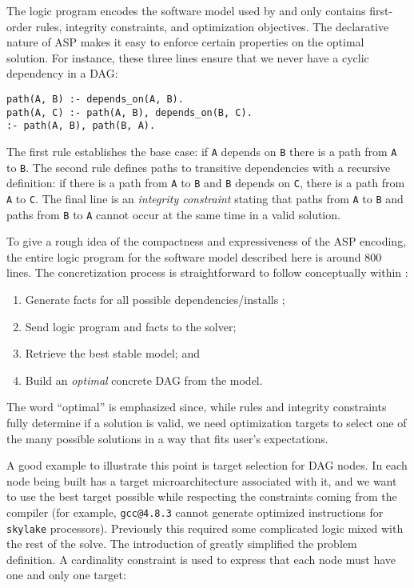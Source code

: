 The logic program encodes the software model used by \spack{} and only contains
first-order rules, integrity constraints, and optimization objectives. The declarative
nature of ASP makes it easy to enforce certain properties on the optimal solution. For
instance, these three lines ensure that we never have a cyclic dependency in a DAG:

\begin{verbatim}
path(A, B) :- depends_on(A, B).
path(A, C) :- path(A, B), depends_on(B, C).
:- path(A, B), path(B, A).
\end{verbatim}

The first rule establishes the base case: if \texttt{A} depends
on \texttt{B} there is a path from \texttt{A} to \texttt{B}.
The second rule defines paths to transitive dependencies
with a recursive definition: if there is a path from \texttt{A}
to \texttt{B} and \texttt{B} depends on \texttt{C}, there is
a path from \texttt{A} to \texttt{C}. The final line is an
\emph{integrity constraint} stating that paths from \texttt{A}
to \texttt{B} and paths from \texttt{B} to \texttt{A} cannot
occur at the same time in a valid solution.

To give a rough idea of the compactness and expressiveness of the ASP encoding, the
entire logic program for the software model described here is around $800$ lines. The
concretization process is straightforward to follow conceptually within \spack:
\begin{enumerate}
\item Generate facts for all possible dependencies/installs \footnotemark;
\item Send logic program and facts to the solver;
\item Retrieve the best stable model; and
\item Build an {\it optimal} concrete DAG from the model.
\end{enumerate}
The word ``optimal'' is emphasized since, while rules and integrity
constraints fully determine if a solution is valid, we need
optimization targets to select one of the many possible solutions
in a way that fits user's expectations.

A good example to illustrate this point is target selection for DAG nodes. In \spack{}
each node being built has a target microarchitecture associated with it, and we want to
use the best target possible while respecting the constraints coming from the compiler
(for example, {\tt gcc@4.8.3} cannot generate optimized instructions for {\tt skylake}
processors). Previously this required some complicated logic mixed with the rest of the
solve. The introduction of \clingo{} greatly simplified the problem definition. A
cardinality constraint is used to express that each node must have one and only one
target:

